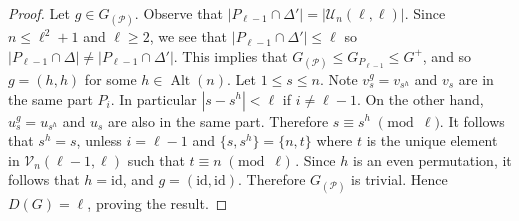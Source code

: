 \documentclass[11pt]{amsart}
\newtheorem{claim}{Claim}
\DeclareMathOperator{\Alt}{Alt}
\DeclareMathOperator{\Diag}{Diag}
\begin{document}
\begin{proof}
Let \(g\in G_{(\mathcal{P})}\). 
Observe that $|P_{\ell-1}\cap\Delta'|=|\mathcal{U}_n(\ell,\ell)|$. Since $n\leqslant \ell^2+1$ and $\ell\geqslant 2$, we see that   $|P_{\ell-1}\cap\Delta'|\leqslant \ell$ so $|P_{\ell-1}\cap\Delta|\neq |P_{\ell-1}\cap\Delta'|$. This implies that \(G_{(\mathcal{P})}\leqslant G_{P_{\ell-1}}\leqslant G^{+}\), and so $g=(h,h)$ for some $h\in \Alt(n)$. 
  Let $1\leqslant s\leqslant n$. Note $v_s^g=v_{s^h}$ and $v_s$ are in the same part $P_i$. In particular $ |s-s^h|<\ell$ if $i\neq \ell-1$. On the other hand, $u_s^g=u_{s^h}$ and $u_s$ are also in the same part. Therefore $s\equiv s^h \;\pmod {\ell}$. It follows that $s^h=s$, unless $i=\ell-1$ and $\{s,s^h\}=\{n,t\}$ where $t$ is the unique element in  $\mathcal{V}_n(\ell-1,\ell)$ such that  $t\equiv n \;\pmod {\ell}$ . Since $h$ is an even permutation, it follows that $h=\mathrm{id}$, and  $g=(\mathrm{id},\mathrm{id}).$
  Therefore $G_{(\mathcal{P})}$ is trivial.  
% 
% 
% 
% 
% 
Hence \(D(G)=\ell\), proving the result.
\end{proof}

\end{document}
